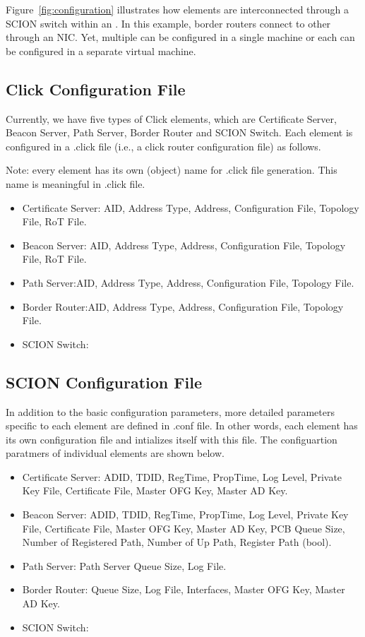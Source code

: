 Figure~\ref{fig:configuration} illustrates how elements are interconnected through a SCION switch within an \AD. In this example, border routers connect to other \ADs through an NIC. Yet, multiple \ADs can be configured in a single machine or each \AD can be configured in a separate virtual machine.


\subsection{Click Configuration File}
Currently, we have five types of Click elements, which are Certificate Server, Beacon Server, Path Server, Border Router and SCION Switch.  
Each element is configured in a .click file (i.e., a click router configuration file) as follows.

Note: every element has its own (object) name for .click file generation. This name is meaningful in .click file.

\begin{itemize}
\item Certificate Server: AID, Address Type, Address, Configuration File, Topology File, RoT File.
\item Beacon Server: AID, Address Type, Address, Configuration File, Topology File, RoT File.
\item Path Server:AID, Address Type, Address, Configuration File, Topology File.
\item Border Router:AID, Address Type, Address, Configuration File, Topology File.
\item SCION Switch:
\end{itemize}

\subsection{SCION Configuration File}
In addition to the basic configuration parameters, more detailed parameters specific to each element are defined in .conf file. In other words, each element has its own configuration file and intializes itself with this file. The configuartion paratmers of individual elements are shown below.

\begin{itemize}
\item Certificate Server: ADID, TDID, RegTime, PropTime, Log Level, Private Key File, Certificate File, Master OFG Key, Master AD Key.
\item Beacon Server: ADID, TDID, RegTime, PropTime, Log Level, Private Key File, Certificate File, Master OFG Key, Master AD Key, PCB Queue Size, Number of Registered Path, Number of Up Path, Register Path (bool).
\item Path Server: Path Server Queue Size,  Log File.
\item Border Router: Queue Size, Log File, Interfaces, Master OFG Key, Master AD Key. 
\item SCION Switch:
\end{itemize}

